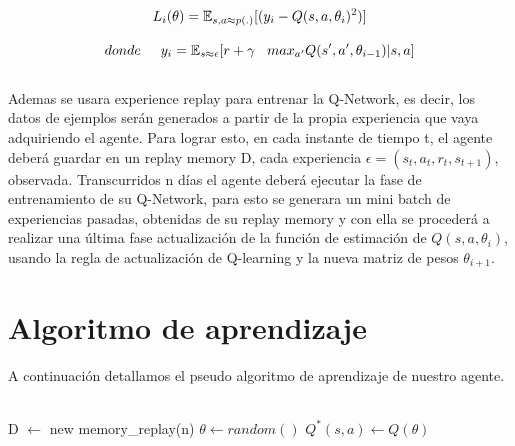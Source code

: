 \begin{equation}
L_i(\theta) = \operatorname{\mathbb{E}}_{s, a \approx p(.)}[(y_i - Q(s, a, \theta_i)^2)]
\\\\ 
\end{equation}

\begin{equation}
donde \hspace*{0.5cm}  y_i =  \operatorname{\mathbb{E}}_{s \approx \epsilon}[r + \gamma  \hspace*{0.3cm}  max_{a'} Q(s', a', \theta_{i-1}) | s, a]
\end{equation}
\\

Ademas se usara  experience replay para entrenar la Q-Network, es decir, los datos de ejemplos serán generados a partir de la propia experiencia que vaya adquiriendo el agente. Para lograr esto, en cada instante de tiempo t, el agente deberá guardar en un replay memory D, cada experiencia $\epsilon = (s_t, a_t, r_t, s_{t+1})$, observada.
Transcurridos n días el agente deberá ejecutar la fase de entrenamiento de su Q-Network, para esto se generara un mini batch de experiencias pasadas, obtenidas de  su replay memory y con ella se procederá a realizar una última fase actualización de la función de estimación de $Q(s, a, \theta_i)$, usando la regla de actualización de Q-learning y la nueva matriz de pesos $\theta_{i+1}$.


\section{Algoritmo de aprendizaje}

A continuación detallamos el pseudo algoritmo de aprendizaje de nuestro agente.
\\
\\
\begin{algorithm}[1]
\State D $\gets$ new memory\_replay(n)
\State $\theta \gets random() $
\State $Q^*(s, a) \gets Q(\theta)$

\EndWhile
\end{algorithm}

